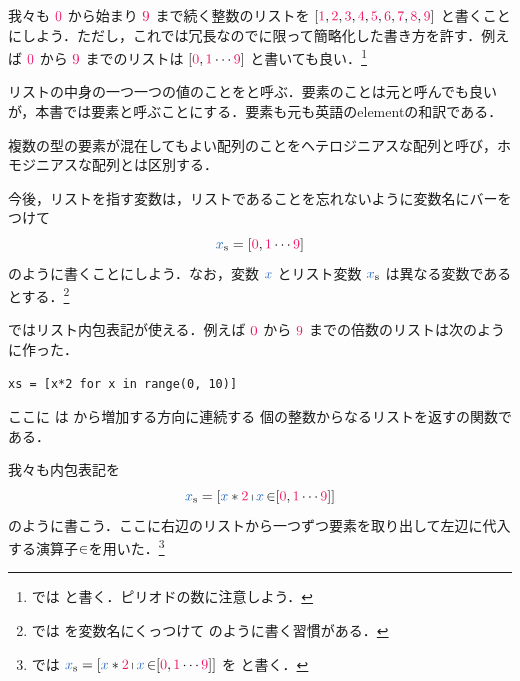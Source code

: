 \documentclass[a5paper,twoside,fleqn,draft]{jsbook}
\begin{document}
我々も $\hConstant{0}$ から始まり $\hConstant{9}$ まで続く整数のリストを $[\hConstant{1},\hConstant{2},\hConstant{3},\hConstant{4},\hConstant{5},\hConstant{6},\hConstant{7},\hConstant{8},\hConstant{9}]$ と書くことにしよう．ただし，これでは冗長なのでに限って簡略化した書き方を許す．例えば $\hConstant{0}$ から $\hConstant{9}$ までのリストは $[\hConstant{0},\hConstant{1}\dotsb\hConstant{9}]$ と書いても良い．\footnote{\haskell では \code{[0, 1..9]} と書く．ピリオドの数に注意しよう．}

リストの中身の一つ一つの値のことをと呼ぶ．要素のことは元と呼んでも良いが，本書では要素と呼ぶことにする．要素も元も英語のelementの和訳である．

複数の型の要素が混在してもよい配列のことをヘテロジニアスな配列と呼び，ホモジニアスな配列とは区別する．

今後，リストを指す変数は，リストであることを忘れないように変数名にバーをつけて
\begin{equation}
  \hListVar{x}
  =\hListWith{\hConstant{0},\hConstant{1}\dotsb\hConstant{9}}
\end{equation}
のように書くことにしよう．なお，変数 $\hVar{x}$ とリスト変数 $\hListVar{x}$ は異なる変数であるとする．\footnote{\haskell では  を変数名にくっつけて  のように書く習慣がある．}

\separator

\python ではリスト内包表記が使える．例えば $\hConstant{0}$ から $\hConstant{9}$ までの倍数のリストは次のように作った．
\begin{pythoncode}
\begin{verbatim}
xs = [x*2 for x in range(0, 10)]
\end{verbatim}
\end{pythoncode}
ここに  は  から増加する方向に連続する  個の整数からなるリストを返す\python の関数である．

我々も内包表記を
\begin{equation}
  \hListVar{x}
  =\hListWith{\hVar{x}*\hConstant{2}\hListComprehension\hVar{x}\hFrom\hListWith{\hConstant{0},\hConstant{1}\dotsb\hConstant{9}}}
\end{equation}
のように書こう．ここに右辺のリストから一つずつ要素を取り出して左辺に代入する演算子$\operatorname{\in}$を用いた．\footnote{\haskell では $  \hListVar{x}=\hListWith{\hVar{x}*\hConstant{2}\hListComprehension\hVar{x}\hFrom\hListWith{\hConstant{0},\hConstant{1}\dotsb\hConstant{9}}}
$ を  と書く．}
\end{document}
